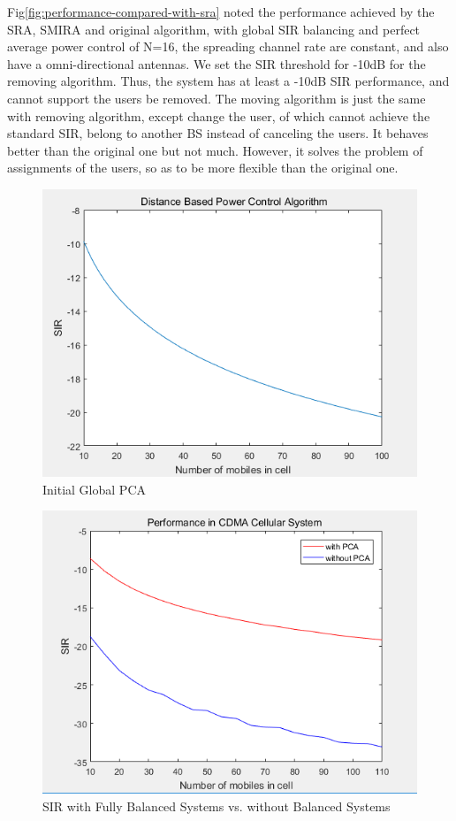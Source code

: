 \documentclass[conference]{IEEEtran}
\begin{document}
Fig\ref{fig:performance-compared-with-sra} noted the performance achieved by the SRA, SMIRA and original algorithm, with global SIR balancing and perfect average power control of N=16, the spreading channel rate are constant, and also have a omni-directional antennas. We set the SIR threshold for -10dB for the removing algorithm. Thus, the system has at least a -10dB SIR performance, and cannot support the users be removed. The moving algorithm is just the same with removing algorithm, except change the user, of which cannot achieve the standard SIR, belong to another BS instead of canceling the users. It behaves better than the original one but not much. However, it solves the problem of assignments of the users, so as to be more flexible than the original one.   
%
%

\begin{figure}[th]
	\centering
	\includegraphics[width=0.65\linewidth]{"initial global PCA"}
	\caption{Initial Global PCA}
	\label{fig:initial-global-pca}
\end{figure}


\begin{figure}[th]
	\centering
	\includegraphics[width=0.65\linewidth]{"performance compared"}
	\caption{SIR with Fully Balanced Systems vs. without Balanced Systems }
	\label{fig:performance-compared}
\end{figure}
\end{document}
